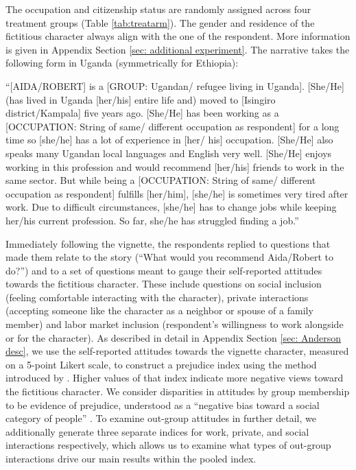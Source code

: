 \documentclass[a4paper,12pt]{article}
\begin{document}
The occupation and citizenship status are randomly assigned across four treatment groups (Table \ref{tab:treatarm}). The gender and residence of the fictitious character always align with the one of the respondent. More information is given in Appendix Section \ref{sec: additional experiment}. The narrative takes the following form in Uganda (symmetrically for Ethiopia): \\
    
    \begin{adjustwidth}{0.8cm}{0.8cm}
        \noindent 
        ``[AIDA/ROBERT] is a [GROUP: Ugandan/ refugee living in Uganda]. [She/He] (has lived in Uganda [her/his] entire life and) moved to [Isingiro district/Kampala] five years ago. [She/He] has been working as a [OCCUPATION: String of same/ different occupation as respondent] for a long time so [she/he] has a lot of experience in [her/ his] occupation. [She/He] also speaks many Ugandan local languages and English very well. [She/He] enjoys working in this profession and would recommend [her/his] friends to work in the same sector. But while being a [OCCUPATION: String of same/ different occupation as respondent] fulfills [her/him], [she/he] is sometimes very tired after work.  Due to difficult circumstances, [she/he] has to change jobs while keeping her/his current profession. So far, she/he has struggled finding a job.'' \\
    \end{adjustwidth} 

\noindent   
Immediately following the vignette, the respondents replied to questions that made them relate to the story (``What would you recommend Aida/Robert to do?'') and to a set of questions meant to gauge their self-reported attitudes towards the fictitious character. These include questions on social inclusion (feeling comfortable interacting with the character), private interactions (accepting someone like the character as a neighbor or spouse of a family member) and labor market inclusion (respondent's willingness to work alongside or for the character). As described in detail in Appendix Section \ref{sec: Anderson desc}, we use the self-reported attitudes towards the vignette character, measured on a 5-point Likert scale, to construct a prejudice index using the method introduced by \citet{anderson2008multiple}. Higher values of that index indicate more negative views toward the fictitious character. We consider disparities in attitudes by group membership to be evidence of prejudice, understood as a ``negative bias toward a social category of people'' \cite[p. 340]{paluck2009prejudice}. To examine out-group attitudes in further detail, we additionally generate three separate indices for work, private, and social interactions respectively, which allows us to examine what types of out-group interactions drive our main results within the pooled index.
\end{document}
